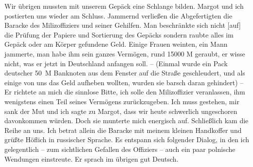 Wir übrigen mussten mit unserem Gepäck eine Schlange bilden. Margot und ich postierten uns wieder am Schluss. Jammernd verließen  die Abgefertigten die Baracke des Milizoffiziers und seiner Gehilfen. Man beschränkte sich nicht [auf] die Prüfung der Papiere und Sortierung des Gepäcks sondern raubte alles im Gepäck oder am Körper gefundene Geld. Einige Frauen weinten, ein Mann jammerte, man habe ihm sein ganzes Vermögen, rund \num{15000} M geraubt, er wisse nicht, was er jetzt in Deutschland anfangen soll. -- (Einmal wurde ein Pack deutscher 50~M Banknoten aus dem Fenster auf die Straße geschleudert, und als einige von uns das Geld aufheben wollten, wurden sie barsch daran gehindert) -- Er richtete an mich die sinnlose Bitte, ich solle den Milizoffizier veranlassen, ihm wenigstens einen Teil seines Vermögens zurückzugeben. Ich muss gestehen, mir sank der Mut und ich sagte zu Margot, dass wir heute schwerlich ungeschoren davonkommen würden. Doch sie munterte mich energisch auf. Schließlich kam die Reihe an uns. Ich betrat allein die Baracke mit meinem kleinen Handkoffer und grüßte Höflich in russischer Sprache. Es entspann sich folgender Dialog, in den ich gelegentlich -- zum sichtlichen Gefallen des Offiziers -- auch ein paar polnische Wendungen einstreute. Er sprach im übrigen gut Deutsch.

